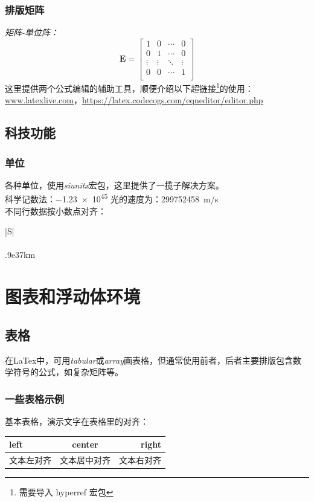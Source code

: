 \documentclass{ctexart} %
\begin{document}
            \subsubsection{排版矩阵}
                \emph{矩阵-单位阵：}
                \[
                    \mathbf{E}=\begin{bmatrix}
                        1 & 0 & \cdots & 0 \\
                        0 & 1 & \cdots & 0\\
                        \vdots & \vdots & \ddots & \vdots\\
                        0 & 0 & \cdots & 1\\
                    \end{bmatrix}    
                \]
                这里提供两个公式编辑的辅助工具，顺便介绍以下超链接\footnote{需要导入 hyperref 宏包}的使用：\url{www.latexlive.com}，\url{https://latex.codecogs.com/eqneditor/editor.php}
        \subsection{科技功能}
            \subsubsection{单位}  
            各种单位，使用\emph{siunitx}宏包，这里提供了一揽子解决方案。\\
            科学记数法：\num{-1.23e45}
            光的速度为：\SI{299752458}{m/s}\\
            不同行数据按小数点对齐：
            \begin{tabular}{|S|}
                \\
                \\ 
                \hline
                .9e37km\\
                \hline
            \end{tabular}
    \section{图表和浮动体环境}
        \subsection{表格} 
        在LaTex中，可用\emph{tabular}或\emph{array}画表格，但通常使用前者，后者主要排版包含数学符号的公式，如复杂矩阵等。
            \subsubsection{一些表格示例}
            基本表格，演示文字在表格里的对齐：\\
            \begin{tabular}{|l|c|r|}
                \hline
                left & center & right \\
                \hline
                文本左对齐 & 文本居中对齐 & 文本右对齐\\
                \hline
            \end{tabular}
\end{document}
